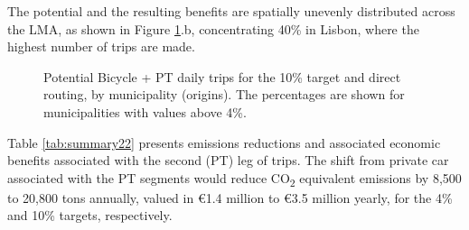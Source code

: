 \documentclass[review, doubleblind, 3p,
authoryear]{elsarticle} %
\begin{document}
The potential and the resulting benefits are spatially unevenly
distributed across the LMA, as shown in Figure \ref{fig:mapzones}.b,
concentrating 40\% in Lisbon, where the highest number of trips are
made.

\begin{figure}
\caption{\label{mapzones}Potential Bicycle + PT daily trips for the 10\% target and direct routing, by municipality (origins). The percentages are shown for municipalities with values above 4\%.}\label{fig:mapzones}
\end{figure}

Table \ref{tab:summary22} presents emissions reductions and associated
economic benefits associated with the second (PT) leg of trips. The
shift from private car associated with the PT segments would reduce
CO\textsubscript{2} equivalent emissions by 8,500 to 20,800 tons
annually, valued in €1.4 million to €3.5 million yearly, for the 4\% and
10\% targets, respectively.
\end{document}
